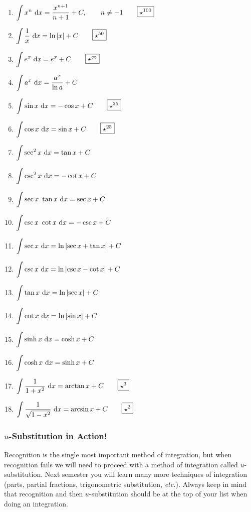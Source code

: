 \documentclass[12pt,addpoints, answers, fleqn]{exam}
\begin{document}
\begin{enumerate}
\item $\displaystyle \int x^n \ {\rm{d}} x = \frac{x^{n+1}}{n+1} + C, \qquad n \neq -1 \qquad \boxed{\star^{100}}$
\item $\displaystyle \int \frac{1}{x} \ {\rm{d}} x = \ln \left| x \right| + C \qquad \boxed{\star^{50}}$
\item $\displaystyle \int e^x \ {\rm{d}} x = e^x + C \qquad \boxed{\star^{\infty}}$
\item $\displaystyle \int a^x \ {\rm{d}} x = \frac{a^x}{\ln a} + C$
\item $\displaystyle \int \sin x \ {\rm{d}} x = -\cos x + C \qquad \boxed{\star^{25}}$
\item $\displaystyle \int \cos x \ {\rm{d}} x = \sin x + C \qquad \boxed{\star^{25}}$
\item $\displaystyle \int \sec^2 x \ {\rm{d}} x = \tan x + C$
\item $\displaystyle \int \csc^2 x \ {\rm{d}} x = -\cot x + C$
\item $\displaystyle \int \sec x \ \tan x  \ {\rm{d}} x = \sec x + C$
\item $\displaystyle \int \csc x \ \cot x \ {\rm{d}} x = -\csc x + C$
\item $\displaystyle \int \sec x \ {\rm{d}} x = \ln \left| \sec x + \tan x \right| + C$
\item $\displaystyle \int \csc x \ {\rm{d}} x = \ln \left| \csc x - \cot x \right| + C$
\item $\displaystyle \int \tan x \ {\rm{d}} x = \ln \left| \sec x \right| + C$
\item $\displaystyle \int \cot x \ {\rm{d}} x = \ln \left| \sin x \right| + C$
\item $\displaystyle \int \sinh x \ {\rm{d}} x = \cosh x + C$
\item $\displaystyle \int \cosh x \ {\rm{d}} x = \sinh x + C$
\item $\displaystyle \int \frac{1}{1+x^2} \ {\rm{d}} x = \arctan x + C\qquad \boxed{\star^3}$
\item $\displaystyle \int \frac{1}{\sqrt{1 - x^2}} \ {\rm{d}} x = \arcsin x + C \qquad \boxed{\star^2}$
\end{enumerate}

\subsubsection{$u$-Substitution in Action!}
Recognition is the single most important method of integration, but when recognition fails we will need to proceed with a method of integration called $u$-substitution. Next semester you will learn many more techniques of integration (parts, partial fractions, trigonometric substitution, \emph{etc.}). Always keep in mind that recognition and then $u$-substitution should be at the top of your list when doing an integration.
\end{document}
